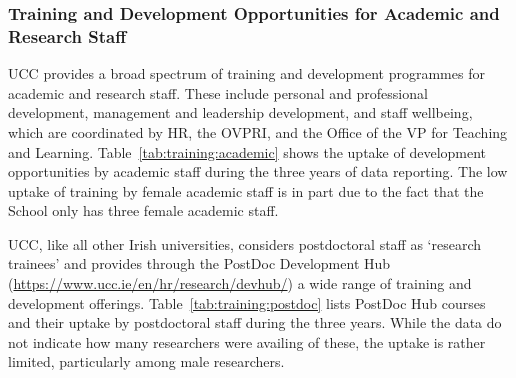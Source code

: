 \subsubsection{Training and Development Opportunities for Academic and Research Staff}
UCC provides a broad spectrum of training and development programmes for academic and research staff. These include personal and professional development, management and leadership development, and staff wellbeing, which are coordinated by HR, the \ac{OVPRI}, and the Office of the VP for Teaching and Learning. 
Table~\ref{tab:training:academic} 
shows the uptake of development opportunities by academic staff during the three years of data reporting. The low uptake of training by female academic staff is in part due to the fact that the School only has three female academic staff. 




UCC, like all other Irish universities, considers postdoctoral staff as `research trainees' and provides through the PostDoc Development Hub (\url{https://www.ucc.ie/en/hr/research/devhub/}) a wide range of training and development offerings. Table~\ref{tab:training:postdoc} lists PostDoc Hub courses and their uptake by postdoctoral staff during the three years. While the data do not indicate how many researchers were availing of these, the uptake is rather limited, particularly among male researchers. 




